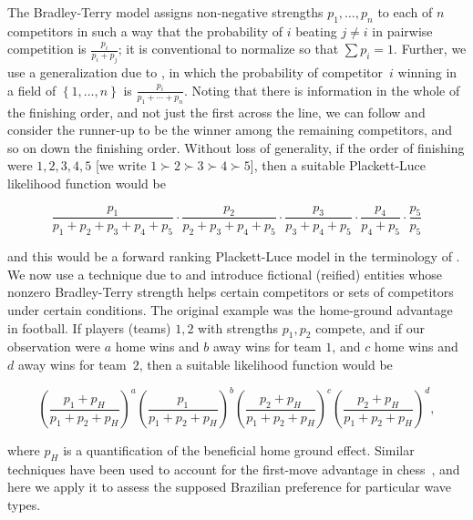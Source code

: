 \documentclass{article}
\begin{document}
The Bradley-Terry model \citep{bradley1954} assigns non-negative
strengths $p_1,\ldots, p_n$ to each of $n$ competitors in such a way
that the probability of $i$ beating $j\neq i$ in pairwise competition
is $\frac{p_i}{p_i+p_j}$; it is conventional to normalize so that
$\sum p_i=1$.  Further, we use a generalization due to
\citep{luce1959}, in which the probability of competitor~$i$ winning
in a field of $\left\lbrace 1,\ldots, n\right\rbrace$ is
$\frac{p_i}{p_1+\cdots +p_n}$.  Noting that there is information in
the whole of the finishing order, and not just the first across the
line, we can follow \citet{plackett1975} and consider the runner-up to
be the winner among the remaining competitors, and so on down the
finishing order. Without loss of generality, if the order of finishing
were $1,2,3,4,5$ [we write $1\succ 2\succ 3\succ 4\succ5$], then a
suitable Plackett-Luce likelihood function would be

\begin{equation}\label{competitors_1_to_5_likelihood}
\frac{p_1}{p_1+p_2+p_3+p_4+p_5}\cdot
\frac{p_2}{p_2+p_3+p_4+p_5}\cdot
\frac{p_3}{p_3+p_4+p_5}\cdot
\frac{p_4}{p_4+p_5}\cdot
\frac{p_5}{p_5}
\end{equation}

and this would be a forward ranking Plackett-Luce model in the
terminology of \citet{johnson2020}.  We now use a technique due to
\citet{hankin2010,hankin2017} and introduce fictional (reified)
entities whose nonzero Bradley-Terry strength helps certain
competitors or sets of competitors under certain conditions.  The
original example was the home-ground advantage in football.  If
players (teams) $1,2$ with strengths $p_1,p_2$ compete, and if our
observation were $a$ home wins and $b$ away wins for team $1$, and $c$
home wins and $d$ away wins for team~$2$, then a suitable likelihood
function would be

\begin{equation}\label{home_ground_advantage}
\left(\frac{p_1+p_H}{p_1+p_2+p_H}\right)^a
\left(\frac{p_1}{p_1+p_2+p_H}\right)^b
\left(\frac{p_2+p_H}{p_1+p_2+p_H}\right)^c
\left(\frac{p_2+p_H}{p_1+p_2+p_H}\right)^d,
\end{equation}

\noindent where $p_H$ is a quantification of the beneficial home
ground effect.  Similar techniques have been used to account for the
first-move advantage in chess~\citep{hankin2020}, and here we apply it
to assess the supposed Brazilian preference for particular wave types.
\end{document}
